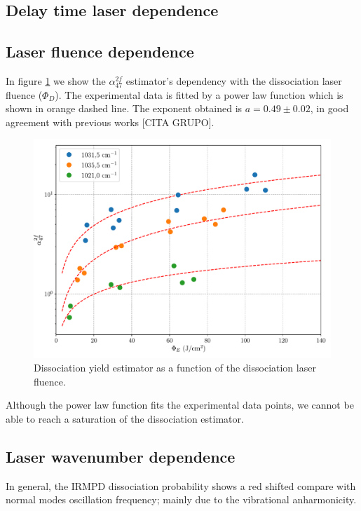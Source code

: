 \documentclass[global,twocolumn]{svjour}
\begin{document}
\subsection{Delay time laser dependence}

\subsection{Laser fluence dependence}
In figure \ref{fig:alpha_phi_excitation} we show the $\alpha^{2f}_{47}$ estimator's dependency with the dissociation laser fluence ($\Phi_{D}$). The experimental data is fitted by a power law function which is shown in orange dashed line. The exponent obtained is $a = 0.49\pm 0.02$, in good agreement with previous works [CITA GRUPO].  

\begin{figure}[h]
	\centering
	\includegraphics[width = 1\linewidth]{figures/alpha_47_phi_bombeo.pdf}
	\caption{\label{fig:alpha_phi_excitation} Dissociation yield estimator as a function of the dissociation laser fluence.}
\end{figure}

Although the power law function fits the experimental data points, we cannot be able to reach a saturation of the dissociation estimator.  

\subsection{Laser wavenumber dependence}
In general, the IRMPD dissociation probability shows a red shifted compare with normal modes oscillation frequency; mainly due to the vibrational anharmonicity. 
\end{document}
